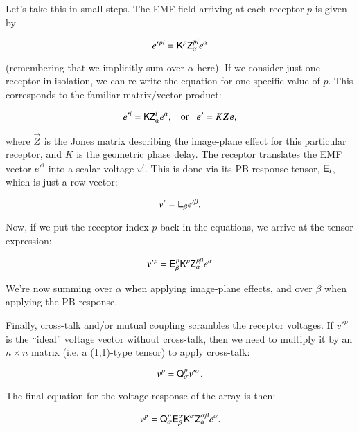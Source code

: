 \documentclass[]{aa}
\newcommand{\jones}[2]{\vec {#1}_{#2}}
\begin{document}
Let's take this in small steps. The EMF field arriving at each receptor $p$ is given by

\begin{equation}
\label{eq:gme-deriv-KZe}
e'^{pi}=\mathsf{K}^{p}\mathsf{Z}_{\alpha}^{pi}e^{\alpha}
\end{equation}

(remembering that we implicitly sum over $\alpha$ here). If we consider just one receptor in isolation, we can re-write the equation for one specific value of $p$. This corresponds to  the familiar matrix/vector product:

\[
e'^i = \tens{K}\tens{Z}_{\alpha}^{i}e^{\alpha},\;\;\;\mbox{or}\;\;\;\vec e' = K \jones{Z}{} \vec e,
\]

where $\jones{Z}{}$ is the Jones matrix describing the image-plane effect for this particular receptor, 
and $K$ is the geometric phase delay. The receptor translates the EMF vector $e'^{i}$ into a scalar voltage $v'$.  
This is done via its PB response tensor, $\mathsf{E}_i$, which is just a row vector:

\[
v'=\mathsf{E}_{\beta}e'^{\beta}.
\]


Now, if we put the receptor index $p$ back in the equations, we arrive at the tensor expression:

\begin{equation}
\label{eq:gme-deriv-EKZe}
v'^{p}=\mathsf{E}_{\beta}^{p}\mathsf{K}^{p}\mathsf{Z}_{\alpha}^{p\beta}e^{\alpha}
\end{equation}

We're now summing over $\alpha$ when applying image-plane effects, and over $\beta$ when applying the PB response.

Finally, cross-talk and/or mutual coupling scrambles the receptor voltages. If $v'^{p}$
is the ``ideal'' voltage vector without cross-talk, then we need to multiply it by an $n\times n$ matrix (i.e. a (1,1)-type tensor)
to apply cross-talk:

\begin{equation}
\label{eq:gme-deriv-Qv}
v^{p}=\mathsf{Q}_{\sigma}^{p}v'^{\sigma}.
\end{equation}

The final equation for the voltage response of the array is then:

\begin{equation}
v^{p}=\mathsf{Q}_{\sigma}^{p}\mathsf{E}_{\beta}^{\sigma}\mathsf{K}^{\sigma}\mathsf{Z}_{\alpha}^{\sigma\beta} e^{\alpha}.
\label{eq:v-tensor}
\end{equation}
\end{document}
